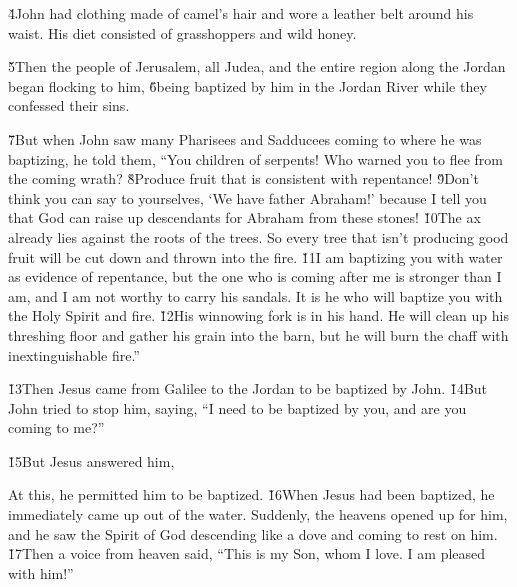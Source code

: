 \v{4}John had clothing made of camel's hair and wore a leather belt around his waist. His diet consisted of grasshoppers and wild honey.

\v{5}Then the people of Jerusalem, all Judea, and the entire region along the Jordan began flocking to him, \v{6}being baptized by him in the Jordan River while they confessed their sins.

\v{7}But when John saw many Pharisees and Sadducees coming to where he was baptizing, he told them, ``You children of serpents! Who warned you to flee from the coming wrath? \v{8}Produce fruit that is consistent with repentance! \v{9}Don't think you can say to yourselves, `We have father Abraham!' because I tell you that God can raise up descendants for Abraham from these stones! \v{10}The ax already lies against the roots of the trees. So every tree that isn't producing good fruit will be cut down and thrown into the fire. \v{11}I am baptizing you with water as evidence of repentance, but the one who is coming after me is stronger than I am, and I am not worthy to carry his sandals. It is he who will baptize you with the Holy Spirit and fire. \v{12}His winnowing fork is in his hand. He will clean up his threshing floor and gather his grain into the barn, but he will burn the chaff with inextinguishable fire.''

\v{13}Then Jesus came from Galilee to the Jordan to be baptized by John. \v{14}But John tried to stop him, saying, ``I need to be baptized by you, and are you coming to me?''

\v{15}But Jesus answered him, 

At this, he permitted him to be baptized. \v{16}When Jesus had been baptized, he immediately came up out of the water. Suddenly, the heavens opened up for him, and he saw the Spirit of God descending like a dove and coming to rest on him. \v{17}Then a voice from heaven said, ``This is my Son, whom I love. I am pleased with him!''

